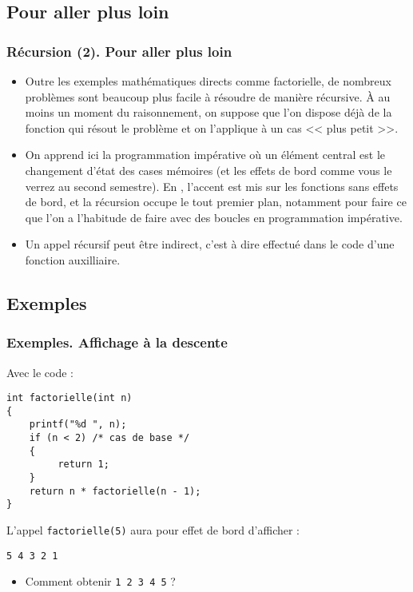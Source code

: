 \documentclass[xcolor=svgnames]{beamer}
\begin{document}
\subsection{Pour aller plus loin}
\begin{frame}[fragile]
  \frametitle{Récursion (2). Pour aller plus loin\nowrite}
  \begin{itemize}
  \item Outre les exemples mathématiques directs comme factorielle, de nombreux problèmes sont beaucoup plus facile à résoudre de manière récursive. À au moins un moment du raisonnement, on suppose que l'on dispose déjà de la fonction qui résout le problème et on l'applique à un cas << plus petit >>.
  \item On apprend ici la programmation impérative où un élément central est le changement d'état des cases mémoires (et les effets de bord comme vous le verrez au second semestre). En , l'accent est mis sur les fonctions sans effets de bord, et la récursion occupe le tout premier plan, notamment pour faire ce que l'on a l'habitude de faire avec des boucles en programmation impérative.
\item \alert{Un appel récursif peut être indirect}, c'est à dire effectué dans le code d'une fonction auxilliaire.
 \end{itemize}
\end{frame}

\subsection{Exemples}
\begin{frame}[fragile]
  \frametitle{Exemples. Affichage à la descente}
Avec le code  :
\begin{lstlisting}[basicstyle=\ttfamily\scriptsize] 
int factorielle(int n)
{
    printf("%d ", n);
    if (n < 2) /* cas de base */
    {
         return 1;
    } 
    return n * factorielle(n - 1); 
}
\end{lstlisting}
L'appel \verb+factorielle(5)+ aura pour effet de bord d'afficher :
\pause
\begin{verbatim}
5 4 3 2 1
\end{verbatim}
\pause
\begin{itemize}
\item  Comment obtenir \verb+1 2 3 4 5+ ?
\end{itemize}
\end{frame}
\end{document}
